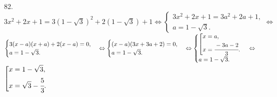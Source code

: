 82. $3x^2+2x+1=3(1-\sqrt{3})^2+2(1-\sqrt{3})+1\Leftrightarrow\begin{cases}3x^2+2x+1=3a^2+2a+1,\\ a=1-\sqrt{3}.\end{cases}
\Leftrightarrow$\\$\begin{cases}3(x-a)(x+a)+2(x-a)=0,\\ a=1-\sqrt{3}.\end{cases}
\Leftrightarrow\begin{cases}(x-a)(3x+3a+2)=0,\\ a=1-\sqrt{3}.\end{cases}
\Leftrightarrow \begin{cases}\left[\begin{gathered}
     x=a,\hfill\\
     x=\cfrac{-3a-2}{3}.\hfill \end{gathered}\right.\\ a=1-\sqrt{3}.\end{cases}\Leftrightarrow$\\$
\left[\begin{gathered}
     x=1-\sqrt{3},\hfill\\
     x=\sqrt{3}-\cfrac{5}{3}.\hfill \end{gathered}\right.$\\
